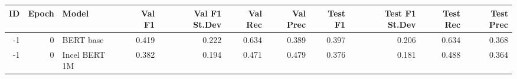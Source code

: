 \begin{tabular}{rrlrrrrrrrr}
\toprule
 ID &  Epoch &         Model &  Val F1 &  Val F1 St.Dev &  Val Rec &  Val Prec &  Test F1 &  Test F1 St.Dev &  Test Rec &  Test Prec \\
\midrule
 -1 &      0 &     BERT base &   0.419 &          0.222 &    0.634 &     0.389 &    0.397 &           0.206 &     0.634 &      0.368 \\
 -1 &      0 & Incel BERT 1M &   0.382 &          0.194 &    0.471 &     0.479 &    0.376 &           0.181 &     0.488 &      0.364 \\
\bottomrule
\end{tabular}
